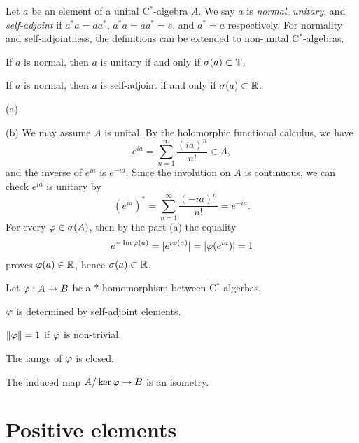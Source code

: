 \documentclass{../../large}
\begin{document}
\begin{prb}
Let $a$ be an element of a unital C$^*$-algebra $A$.
We say $a$ is \emph{normal}, \emph{unitary}, and \emph{self-adjoint} if $a^*a=aa^*$, $a^*a=aa^*=e$, and $a^*=a$ respectively.
For normality and self-adjointness, the definitions can be extended to non-unital C$^*$-algebras.
\begin{parts}
\item If $a$ is normal, then $a$ is unitary if and only if $\sigma(a)\subset\mathbb{T}$.
\item If $a$ is normal, then $a$ is self-adjoint if and only if $\sigma(a)\subset\mathbb{R}$.
\end{parts}
\end{prb}
\begin{pf}
(a)

(b)
We may assume $A$ is unital.
By the holomorphic functional calculus, we have
\[e^{ia}=\sum_{n=1}^\infty\frac{(ia)^n}{n!}\in A,\]
and the inverse of $e^{ia}$ is $e^{-ia}$.
Since the involution on $A$ is continuous, we can check $e^{ia}$ is unitary by
\[(e^{ia})^*=\sum_{n=1}^\infty\frac{(-ia)^n}{n!}=e^{-ia}.\]
For every $\varphi\in\sigma(A)$, then by the part (a) the equality
\[e^{-\operatorname{Im}\varphi(a)}=|e^{i\varphi(a)}|=|\varphi(e^{ia})|=1\]
proves $\varphi(a)\in\mathbb{R}$, hence $\sigma(a)\subset\mathbb{R}$.
\end{pf}

\begin{prb}[$*$-homomorphism]
Let $\varphi:A\to B$ be a $*$-homomorphism between C$^*$-algerbas.
\begin{parts}
\item $\varphi$ is determined by self-adjoint elements.
\item $\|\varphi\|=1$ if $\varphi$ is non-trivial.
\item The iamge of $\varphi$ is closed.
\item The induced map $A/\ker\varphi\to B$ is an isometry.
\end{parts}
\end{prb}



\section{Positive elements}
\end{document}

